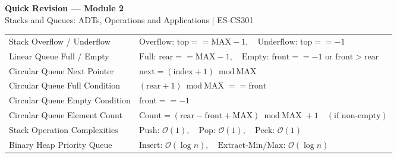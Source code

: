 \documentclass[12pt,a4paper]{article}
\renewcommand{\arraystretch}{1.45}
\begin{document}
\newpage
\begin{center}
  {\large\bfseries\color{myred} Quick Revision --- Module 2}\\[3pt]
  {\small\color{mydark} Stacks and Queues: ADTs, Operations and Applications $|$ ES-CS301}
\end{center}
\noindent{\color{myred}\rule{\linewidth}{1.2pt}}
\vspace{4pt}

\begin{tcolorbox}[formulabox, title={\textbf{Key Formulas and Boundary Conditions at a Glance}}]
\renewcommand{\arraystretch}{1.25}
\begin{tabularx}{\linewidth}{B{5.0cm} X}
Stack Overflow / Underflow & $\text{Overflow: } \text{top} == \text{MAX} - 1, \quad \text{Underflow: } \text{top} == -1$ \\[2pt]
Linear Queue Full / Empty & $\text{Full: } \text{rear} == \text{MAX} - 1, \quad \text{Empty: } \text{front} == -1 \text{ or } \text{front} > \text{rear}$ \\[2pt]
Circular Queue Next Pointer & $\text{next} = (\text{index} + 1) \bmod \text{MAX}$ \\[2pt]
Circular Queue Full Condition & $(\text{rear} + 1) \bmod \text{MAX} == \text{front}$ \\[2pt]
Circular Queue Empty Condition & $\text{front} == -1$ \\[2pt]
Circular Queue Element Count & $\text{Count} = (\text{rear} - \text{front} + \text{MAX}) \bmod \text{MAX} + 1 \quad (\text{if non-empty})$ \\[2pt]
Stack Operation Complexities & $\text{Push: } \mathcal{O}(1), \quad \text{Pop: } \mathcal{O}(1), \quad \text{Peek: } \mathcal{O}(1)$ \\[2pt]
Binary Heap Priority Queue & $\text{Insert: } \mathcal{O}(\log n), \quad \text{Extract-Min/Max: } \mathcal{O}(\log n)$ \\[2pt]
\end{tabularx}
\end{tcolorbox}
\end{document}
